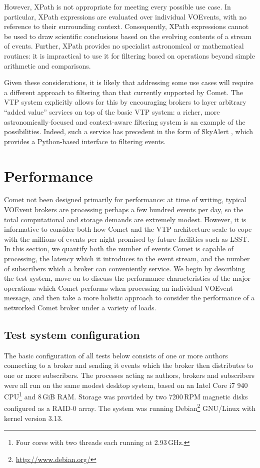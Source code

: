 \documentclass[5p,authoryear]{elsarticle}
\begin{document}
However, XPath is not appropriate for meeting every possible use case. In
particular, XPath expressions are evaluated over individual VOEvents, with no
reference to their surrounding context. Consequently, XPath expressions cannot
be used to draw scientific conclusions based on the evolving contents of a
stream of events. Further, XPath provides no specialist astronomical or
mathematical routines: it is impractical to use it for filtering based on
operations beyond simple arithmetic and comparisons.

Given these considerations, it is likely that addressing some use cases will
require a different approach to filtering than that currently supported by
Comet. The VTP system explicitly allows for this by encouraging
brokers to layer arbitrary ``added value'' services on top of the basic VTP
system: a richer, more astronomically-focused and context-aware filtering
system is an example of the possibilities. Indeed, such a service has
precedent in the form of SkyAlert \citep{Williams:2009}, which provides a
Python-based interface to filtering events.

\section{Performance}
\label{sec:perf}

Comet not been designed primarily for performance: at time of writing, typical
VOEvent brokers are processing perhaps a few hundred events per day, so the
total computational and storage demands are extremely modest. However, it is
informative to consider both how Comet and the VTP architecture scale to cope
with the millions of events per night promised by future facilities such as
LSST\@. In this section, we quantify both the number of events Comet is
capable of processing, the latency which it introduces to the event stream,
and the number of subscribers which a broker can conveniently service. We
begin by describing the test system, move on to discuss the performance
characteristics of the major operations which Comet performs when processing
an individual VOEvent message, and then take a more holistic approach to
consider the performance of a networked Comet broker under a variety of loads.

\subsection{Test system configuration}
\label{sec:perf:system}

The basic configuration of all tests below consists of one or more authors
connecting to a broker and sending it events which the broker then distributes
to one or more subscribers. The processes acting as authors, brokers and
subscribers were all run on the same modest desktop system, based on an Intel
Core i7 940 CPU\footnote{Four cores with two threads each running at
2.93\,GHz.} and 8\,GiB RAM\@. Storage was provided by two 7200\,RPM magnetic
disks configured as a RAID-0 array. The system was running
Debian\footnote{\url{http://www.debian.org/}} GNU/Linux with kernel version
3.13.
\end{document}
